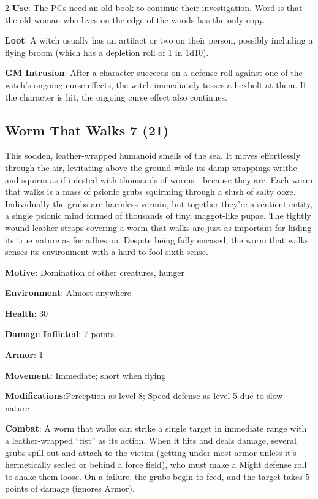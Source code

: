 \begin{multicols}{2}
\textbf{Use}: The PCs need an old book to continue their investigation. Word is that the old woman who lives on the edge of the woods has the only copy.

\textbf{Loot}: A witch usually has an artifact or two on their person, possibly including a flying broom (which has a depletion roll of 1 in 1d10).

\textbf{GM Intrusion}: After a character succeeds on a defense roll against one of the witch’s ongoing curse effects, the witch immediately tosses a hexbolt at them. If the character is hit, the ongoing curse effect also continues.

\subsection{Worm That Walks 7 (21)}

This sodden, leather-wrapped humanoid smells of the sea. It moves effortlessly through the air, levitating above the ground while its damp wrappings writhe and squirm as if infested with thousands of worms—because they are. Each worm that walks is a mass of psionic grubs squirming through a slush of salty ooze. Individually the grubs are harmless vermin, but together they’re a sentient entity, a single psionic mind formed of thousands of tiny, maggot-like pupae. The tightly wound leather straps covering a worm that walks are just as important for hiding its true nature as for adhesion. Despite being fully encased, the worm that walks senses its environment with a hard-to-fool sixth sense. 

\textbf{Motive}: Domination of other creatures, hunger 

\textbf{Environment}: Almost anywhere 

\textbf{Health}: 30 

\textbf{Damage Inflicted}: 7 points

\textbf{Armor}: 1 

\textbf{Movement}: Immediate; short when flying 

\textbf{Modifications}:Perception as level 8; Speed defense as level 5 due to slow nature 

\textbf{Combat}: A worm that walks can strike a single target in immediate range with a leather-wrapped “fist” as its action. When it hits and deals damage, several grubs spill out and attach to the victim (getting under most armor unless it’s hermetically sealed or behind a force field), who must make a Might defense roll to shake them loose. On a failure, the grubs begin to feed, and the target takes 5 points of damage (ignores Armor).


\end{multicols}
